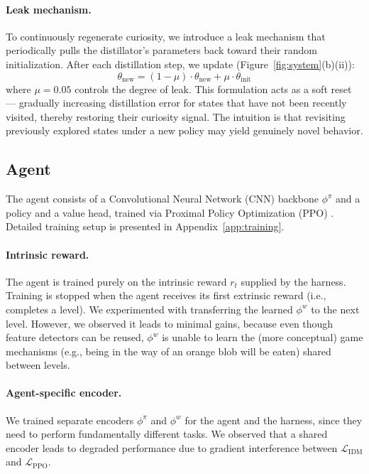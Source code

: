 \documentclass{article}
\begin{document}
\paragraph{Leak mechanism.} To continuously regenerate curiosity, we introduce a leak mechanism that periodically pulls the distillator's parameters back toward their random initialization. After each distillation step, we update (Figure~\ref{fig:system}(b)(ii)):
\begin{equation}
\theta_{\text{new}}=(1-\mu)\cdot\theta_{\text{new}}+\mu \cdot \theta_{\text{init}}
\label{eq:leak}
\end{equation}
where $\mu = 0.05$ controls the degree of leak. This formulation acts as a soft reset --- gradually increasing distillation error for states that have not been recently visited, thereby restoring their curiosity signal. The intuition is that revisiting previously explored states under a new policy may yield genuinely novel behavior.

\subsection{Agent}
The agent consists of a Convolutional Neural Network (CNN) \citep{krizhevsky_imagenet_2012-1} backbone $\phi^\pi$ and a policy and a value head, trained via Proximal Policy Optimization (PPO) \citep{schulman_proximal_2017}. Detailed training setup is presented in Appendix~\ref{app:training}.

\paragraph{Intrinsic reward.} The agent is trained purely on the intrinsic reward $r_t$ supplied by the harness. Training is stopped when the agent receives its first extrinsic reward (i.e., completes a level). We experimented with transferring the learned $\phi^w$ to the next level. However, we observed it leads to minimal gains, because even though feature detectors can be reused, $\phi^w$ is unable to learn the (more conceptual) game mechanisms (e.g., being in the way of an orange blob will be eaten) shared between levels.

\paragraph{Agent-specific encoder.} We trained separate encoders $\phi^\pi$ and $\phi^w$ for the agent and the harness, since they need to perform fundamentally different tasks. We observed that a shared encoder leads to degraded performance due to gradient interference between $\mathcal{L}_{\text{IDM}}$ and $\mathcal{L}_{\text{PPO}}$.
\end{document}
